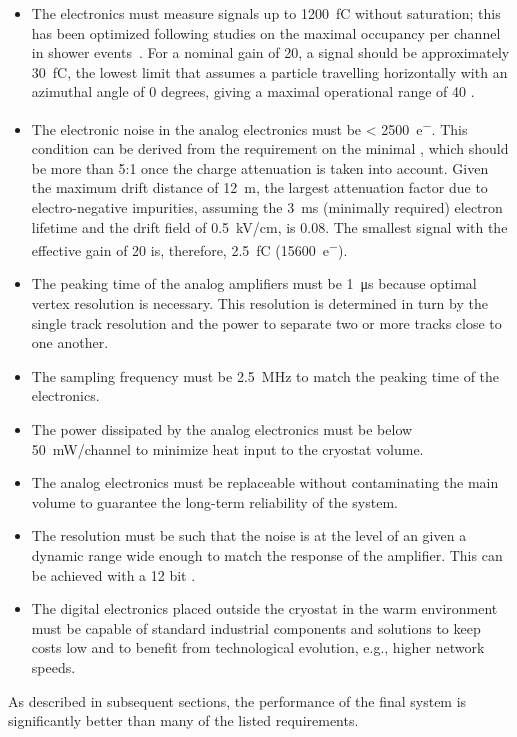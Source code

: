 \begin{itemize}
\item{The  electronics must measure signals up to \SI{1200}{\femto\coulomb} without saturation; this has been optimized following  studies on the maximal occupancy per channel in shower events~\cite{WA105-TDR}. For a nominal  gain of \num{20}, a  signal should be approximately \SI{30}{fC}, the lowest limit that assumes a particle travelling horizontally with an azimuthal angle of \num{0} degrees, giving a maximal operational range of \num{40} .}

\item{The electronic noise in the  analog electronics must be \SI{< 2500}{e^{-}}. This condition can be derived from the requirement on the minimal , which should be more than \num{5}:\num{1} once the charge attenuation is taken into account. Given the maximum drift distance of \SI{12}{\meter}, the largest attenuation factor due to electro-negative impurities, assuming the \SI{3}{\milli\second} (minimally required) electron lifetime and the drift field of \SI{0.5}{\kilo\volt/\cm}, is \num{0.08}. The smallest  signal with the  effective gain of \num{20} is, therefore, \SI{2.5}{\femto\coulomb} (\SI{15600}{e^{-}}).}

\item{The peaking time of the  analog amplifiers must be \SI{1}{\micro\second} because optimal vertex resolution is necessary. This resolution is determined in turn by the single track resolution and the power to separate two or more tracks close to one another.}

\item{The sampling frequency must be \SI{2.5}{\MHz} to match the peaking time of the  electronics.}

\item{The power dissipated by the  analog electronics must be below \SI{50}{\milli\watt/channel} to minimize heat input to the cryostat volume.}

\item{The  analog electronics must be replaceable without contaminating the main \lar volume to guarantee the long-term reliability of the system.}

\item{The  resolution must be such that the noise is at the level of an  given a dynamic range wide enough to match the response of the  amplifier. This can be achieved with a \num{12} bit .}

\item{The digital electronics placed outside the cryostat in the warm environment must be capable of standard industrial components and solutions to keep costs low and to benefit from technological evolution, e.g., higher network speeds.}
\end{itemize}
As described in subsequent sections, the performance of the final system is significantly better than many of the listed requirements. 

